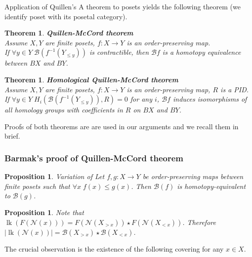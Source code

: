 \documentclass[english,12pt]{article}
\newcounter{stmcounter}[section]
\newcounter{thcounter}
\numberwithin{equation}{section}
\newtheorem{proposition}[stmcounter]{Proposition}
\newtheorem{theorem}[thcounter]{Theorem}
\theoremstyle{definition}
\theoremstyle{remark}
\renewcommand{\leq}{\leqslant}
\begin{document}
Application of Quillen's A theorem to posets yields the following theorem (we identify poset with its posetal category).

\begin{theorem} \textbf{Quillen-McCord theorem}\\
  Assume $X, Y$ are finite posets, $f : X \to Y$ is an order-preserving map.\\
  If $\forall y \in Y\;\mathcal{B}(f^{-1}(Y_{\leqslant y}))$ is contractible, then $\mathcal{B}f$ is a homotopy equivalence between $BX$ and $BY$.\\
\end{theorem}

\begin{theorem} \textbf{Homological Quillen-McCord theorem} {\cite[Corollary 5.5]{Bar11}}\\
  Assume $X, Y$ are finite posets, $f : X \to Y$ is an order-preserving map, $R$ is a PID.\\
  If $\forall y \in Y\;H_i(\mathcal{B}(f^{-1}(Y_{\leqslant y})),R) = 0$ for any $i$, $\mathcal{B}f$ induces isomorphisms of all homology groups with coefficients in $R$ on $BX$ and $BY$.\\
\end{theorem}

Proofs of both theorems are are used in our arguments and we recall them in brief.

\subsubsection{Barmak's proof of Quillen-McCord theorem}

\begin{proposition} {Variation of \cite[Lemma 2.2]{Bar11}}
  \label{prop:comparison}
  Let $f,g : X \to Y$ be order-preserving maps between finite posets such that $\forall x\;f(x) \leq g(x)$. Then $\mathcal{B}(f)$ is homotopy-equivalent to $\mathcal{B}(g)$.
\end{proposition}

\begin{proposition}
  Note that $\operatorname{lk}(F(\mathcal{N}(x))) = F(\mathcal{N}(X_{>x})) \star F(\mathcal{N}(X_{<x}))$. Therefore $\left|\operatorname{lk}(\mathcal{N}(x))\right| = \mathcal{B}(X_{>x}) \star \mathcal{B}(X_{<x})$.
\end{proposition}

The crucial observation is the existence of the following covering for any $x \in X$.
\end{document}
